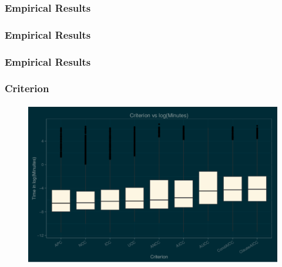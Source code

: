 \begin{frame}
  \frametitle{Empirical Results}
  \framesubtitle{\mbox{}}
  \begin{center}


\end{center}
\end{frame}

\begin{frame}
  \frametitle{Empirical Results}
  \framesubtitle{\mbox{}}
  \begin{center}


\end{center}
\end{frame}

\begin{frame}
  \frametitle{Empirical Results}
  \framesubtitle{\mbox{}}
  \begin{center}


\end{center}
\end{frame}

% 
% 

\begin{frame}
\frametitle{Criterion}
\framesubtitle{\mbox{}}
\begin{figure}
\includegraphics[width=\textwidth]{CriterionBox}
\end{figure}

\vspace{-.10in}
\begin{figure}
\begin{centering}
\end{centering}
\end{figure}

\end{frame}

